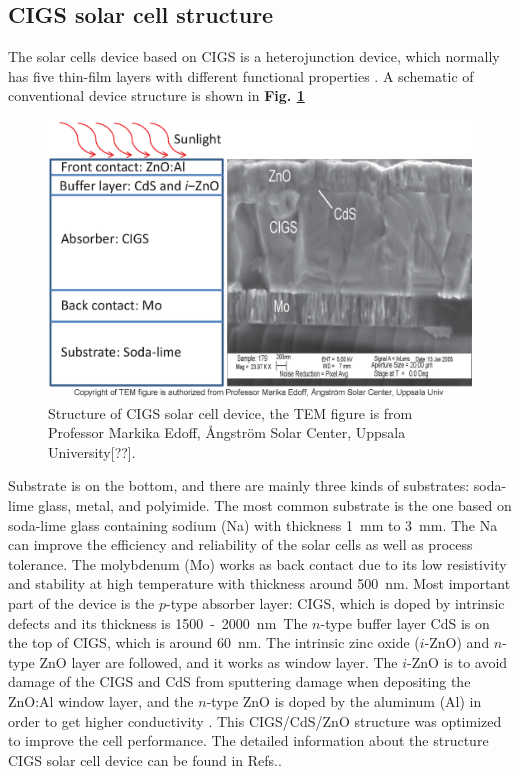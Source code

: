 \documentclass[a4paper, 12pt, titlepage,oneside,drop]{kthesis}
\begin{document}
\subsection{CIGS solar cell structure}

The solar cells device based on CIGS is a heterojunction device, which normally has five thin-film layers with different functional properties \cite{lundberg2005effect, lundberg2003diffusion, ramanathan2003properties}.
A schematic of conventional device structure is shown in  \textbf{Fig. \ref{device}}

\begin{figure}[H]
\centering
\includegraphics[scale=0.5]{devicestruc.eps} 
\caption{{\color{red}Structure of CIGS solar cell device, the TEM figure is from Professor Markika Edoff, Ångström Solar Center, Uppsala University[??].}}
\label{device}
\end{figure}

Substrate is on the bottom, and there are mainly three kinds of substrates: soda-lime glass, metal, and polyimide. The most common substrate is the one based on soda-lime glass containing sodium (Na) with thickness 
\SI{1} {\mm} to \SI{3} {\mm}. The Na can improve the efficiency and reliability of the solar cells as well as process tolerance. The molybdenum (Mo) works as back contact due to its low resistivity and stability at high 
temperature with thickness around \SI{500} {\nm}. Most important part of the device is the $p$-type absorber layer: CIGS, which is doped by intrinsic defects and its thickness is \SI{1500} - \SI{2000} {\nm}. 
The $n$-type buffer layer CdS is on the top of CIGS, which is around \SI{60} {\nm}. The intrinsic zinc oxide ($i$-ZnO) and $n$-type ZnO layer are followed, and it works as window layer. The $i$-ZnO is to 
avoid damage of the CIGS and CdS from sputtering damage when depositing the ZnO:Al window layer, and the $n$-type ZnO is doped by the aluminum (Al) in order to get higher conductivity \cite{kim1997structural, minami1984highly}. 
This CIGS/CdS/ZnO structure was optimized to improve the cell performance. The detailed information about the structure CIGS solar cell device can be found in Refs.\cite{naghavi2010buffer,niki2010cigs, kessler2001baseline}.
\end{document}
